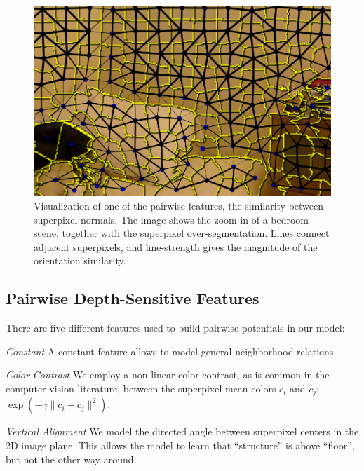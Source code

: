 \begin{figure}
    \begin{center}
        \includegraphics[width=\linewidth]{nyu/images/normal_feature}
    \end{center}
    \vspace{-3mm}
    \caption{%
        Visualization of one of the pairwise features, the similarity between superpixel normals.
        The image shows the zoom-in of a bedroom scene, together with the superpixel over-segmentation.
        Lines connect adjacent superpixels, and line-strength gives the magnitude of the orientation similarity.
    }
    \vspace{-9mm}
\end{figure}

\subsection{Pairwise Depth-Sensitive Features}
There are five different features used to build pairwise potentials in our model:

\emph{Constant}
    A constant feature allows to model general neighborhood relations.


\emph{Color Contrast}
    We employ a non-linear color contrast, as is common in the computer
    vision literature, between the superpixel mean colors $c_i$ and $c_j$:
    $\exp\left(-\gamma \lVert c_i - c_j \rVert^2\right)$.


\emph{Vertical Alignment}
    We model the directed angle between superpixel centers in the 2D image
    plane.  This allows the  model to learn that ``structure'' is above
    ``floor'', but not the other way around.


